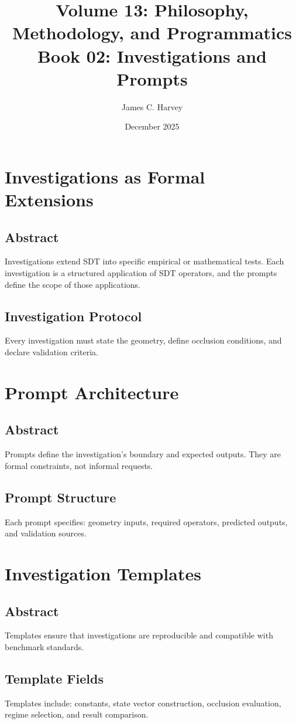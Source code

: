 \documentclass[12pt]{book}
\title{Volume 13: Philosophy, Methodology, and Programmatics \\ Book 02: Investigations and Prompts}
\author{James C. Harvey}
\date{December 2025}
\begin{document}
\maketitle
\tableofcontents

\chapter{Investigations as Formal Extensions}

\section*{Abstract}
Investigations extend SDT into specific empirical or mathematical tests. Each investigation is a
structured application of SDT operators, and the prompts define the scope of those applications.

\section{Investigation Protocol}
Every investigation must state the geometry, define occlusion conditions, and declare validation criteria.

\chapter{Prompt Architecture}

\section*{Abstract}
Prompts define the investigation’s boundary and expected outputs. They are formal constraints, not
informal requests.

\section{Prompt Structure}
Each prompt specifies: geometry inputs, required operators, predicted outputs, and validation sources.

\chapter{Investigation Templates}

\section*{Abstract}
Templates ensure that investigations are reproducible and compatible with benchmark standards.

\section{Template Fields}
Templates include: constants, state vector construction, occlusion evaluation, regime selection, and
result comparison.
\end{document}
